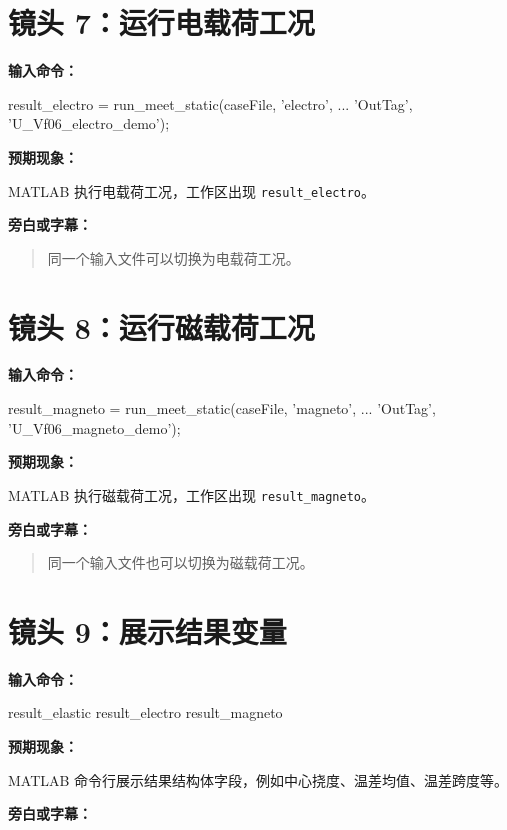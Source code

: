 \documentclass[UTF8,fontset=windows]{ctexart}
\begin{document}
\section{镜头 7：运行电载荷工况}

\textbf{输入命令：}

\begin{code}
result_electro = run_meet_static(caseFile, 'electro', ...
    'OutTag', 'U_Vf06_electro_demo');
\end{code}

\textbf{预期现象：}

MATLAB 执行电载荷工况，工作区出现 \texttt{result\_electro}。

\textbf{旁白或字幕：}

\begin{quote}
同一个输入文件可以切换为电载荷工况。
\end{quote}

\section{镜头 8：运行磁载荷工况}

\textbf{输入命令：}

\begin{code}
result_magneto = run_meet_static(caseFile, 'magneto', ...
    'OutTag', 'U_Vf06_magneto_demo');
\end{code}

\textbf{预期现象：}

MATLAB 执行磁载荷工况，工作区出现 \texttt{result\_magneto}。

\textbf{旁白或字幕：}

\begin{quote}
同一个输入文件也可以切换为磁载荷工况。
\end{quote}

\section{镜头 9：展示结果变量}

\textbf{输入命令：}

\begin{code}
result_elastic
result_electro
result_magneto
\end{code}

\textbf{预期现象：}

MATLAB 命令行展示结果结构体字段，例如中心挠度、温差均值、温差跨度等。

\textbf{旁白或字幕：}
\end{document}
